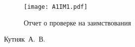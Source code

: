 
\renewcommand\thefigure{\Asbuk{appendix}.\arabic{figure}}    
\setcounter{figure}{0}

\begin{figure}[h!]
    \centering
    \texttt{[image: A1IM1.pdf]}
    \caption{Отчет о проверке на заимствования}
\end{figure}

\vspace{1em}
\hfill 
\underline{\hspace{3cm}} Кутняк~А.~В.